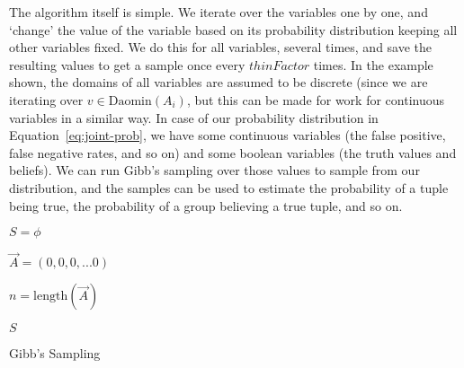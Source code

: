 \documentclass{sig-alternate}
\newcounter{prob}
\begin{document}
The algorithm itself is simple. We iterate over the variables one by one, and `change' the value of the variable based on its probability distribution keeping all other variables fixed. We do this for all variables, several times, and save the resulting values to get a sample once every $thinFactor$ times. In the example shown, the domains of all variables are assumed to be discrete (since we are iterating over $v \in \text{Daomin}(A_i)$, but this can be made for work for continuous variables in a similar way. 
In case of our probability distribution in Equation~\ref{eq:joint-prob}, we have some continuous variables (the false positive, false negative rates, and so on) and some  boolean variables (the truth values and beliefs). We can run Gibb's sampling over those values to sample from our distribution, and the samples can be used to estimate the probability of a tuple being true, the probability of a group believing a true tuple, and so on. 

\begin{algorithm}\label{alg:gibbs}
\scriptsize
{}
$S = \phi$ 

$\overrightarrow{A} = (0,0,0,...0)$ 

$n = \text{length}(\overrightarrow{A})$

\Return $S$
\caption{Gibb's Sampling}
\end{algorithm}
\end{document}
